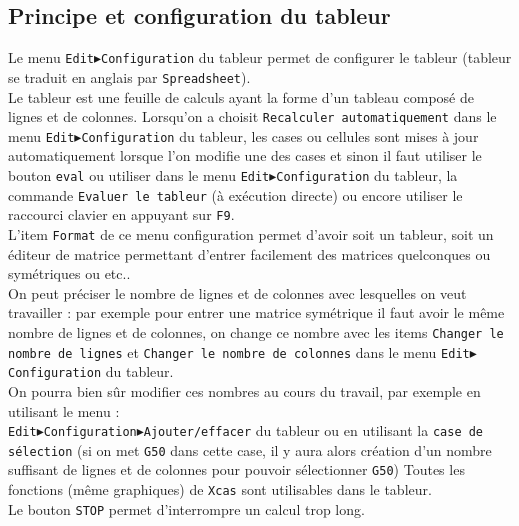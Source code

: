 \documentclass[a4paper,11pt]{book}
\begin{document}
\subsection{Principe et configuration du tableur}
Le menu {\tt Edit$\blacktriangleright$Configuration} du tableur permet de
configurer le tableur (tableur se traduit en anglais par {\tt Spreadsheet}).\\
Le tableur est une feuille de calculs ayant la forme d'un tableau compos\'e de 
lignes et de colonnes. Lorsqu'on a choisit {\tt Recalculer automatiquement} 
dans le menu {\tt Edit$\blacktriangleright$Configuration} du tableur, 
les cases ou cellules sont mises \`a jour automatiquement lorsque l'on modifie 
une des cases et sinon il faut utiliser le bouton {\tt eval} ou utiliser dans
le menu {\tt Edit$\blacktriangleright$Configuration} du tableur, la commande 
{\tt Evaluer le tableur} (\`a ex\'ecution directe) ou encore utiliser le 
raccourci clavier en appuyant sur {\tt F9}.\\ 
L'item {\tt Format} de ce menu configuration permet d'avoir soit un tableur, 
soit un \'editeur de matrice permettant d'entrer facilement des matrices
quelconques ou sym\'etriques  ou etc..\\
On peut pr\'eciser le nombre de lignes et de colonnes avec lesquelles on veut 
travailler : par exemple pour entrer une matrice sym\'etrique il faut avoir le 
m\^eme nombre de lignes et de colonnes, on change ce  nombre avec les items 
{\tt Changer le nombre de lignes} et {\tt Changer le nombre de colonnes} dans 
le menu {\tt  Edit$\blacktriangleright$ Configuration} du tableur.\\
On pourra bien s\^ur modifier ces nombres au cours du travail, par 
exemple en utilisant le menu :\\
{\tt Edit$\blacktriangleright$Configuration$\blacktriangleright$Ajouter/effacer} du tableur  ou en utilisant la {\tt case de s\'election} (si on met {\tt G50}
dans cette case, il y aura alors cr\'eation d'un nombre suffisant de
lignes et de colonnes pour  pouvoir s\'electionner {\tt G50})
Toutes les fonctions (m\^eme graphiques) de {\tt Xcas} sont utilisables dans le
tableur. \\
Le  bouton {\tt STOP} permet d'interrompre un calcul trop long.
\end{document}
